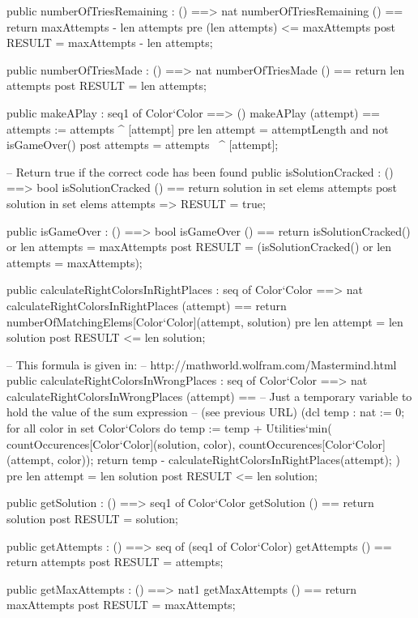 \documentclass{article}
\begin{document}
\begin{vdm_al}
    public numberOfTriesRemaining : () ==> nat
      numberOfTriesRemaining () == return maxAttempts - len attempts
    pre (len attempts) <= maxAttempts
    post RESULT = maxAttempts - len attempts;


    public numberOfTriesMade : () ==> nat
      numberOfTriesMade () == return len attempts
    post RESULT = len attempts;


    public makeAPlay : seq1 of Color`Color ==> ()
      makeAPlay (attempt) == attempts := attempts ^ [attempt]
    pre len attempt = attemptLength and
      not isGameOver()
    post attempts = attempts~ ^ [attempt];


    -- Return true if the correct code has been found
    public isSolutionCracked : () ==> bool
      isSolutionCracked () == return solution in set elems attempts
    post solution in set elems attempts => RESULT = true;


    public isGameOver : () ==> bool
      isGameOver () == return isSolutionCracked() or len attempts = maxAttempts
    post RESULT = (isSolutionCracked() or len attempts = maxAttempts);


    public calculateRightColorsInRightPlaces : seq of Color`Color ==> nat
      calculateRightColorsInRightPlaces (attempt) ==
        return numberOfMatchingElems[Color`Color](attempt, solution)
    pre len attempt = len solution
    post RESULT <= len solution;


    -- This formula is given in:
    -- http://mathworld.wolfram.com/Mastermind.html
    public calculateRightColorsInWrongPlaces : seq of Color`Color ==> nat
      calculateRightColorsInWrongPlaces (attempt) ==
      -- Just a temporary variable to hold the value of the sum expression
      -- (see previous URL)
        (dcl temp : nat := 0;
          for all color in set Color`Colors do
            temp := temp +
              Utilities`min(
                countOccurences[Color`Color](solution, color),
                countOccurences[Color`Color](attempt, color));
          return temp - calculateRightColorsInRightPlaces(attempt);
        )
    pre len attempt = len solution
    post RESULT <= len solution;


    public getSolution : () ==> seq1 of Color`Color
      getSolution () == return solution
    post RESULT = solution;


    public getAttempts : () ==> seq of (seq1 of Color`Color)
      getAttempts () == return attempts
    post RESULT = attempts;


    public getMaxAttempts : () ==> nat1
      getMaxAttempts () == return maxAttempts
    post RESULT = maxAttempts;




\end{vdm_al}
\end{document}
